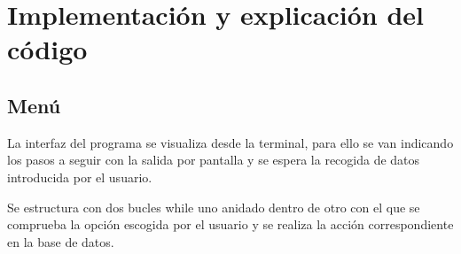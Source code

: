 \chapter{Implementación y explicación del código}

\section{Menú}

La interfaz del programa se visualiza desde la terminal, para ello se van indicando los pasos a seguir con la salida por pantalla y se espera la recogida de datos introducida por el usuario.

Se estructura con dos bucles while uno anidado dentro de otro con el que se comprueba la opción escogida por el usuario y se realiza la acción correspondiente en la base de datos.

